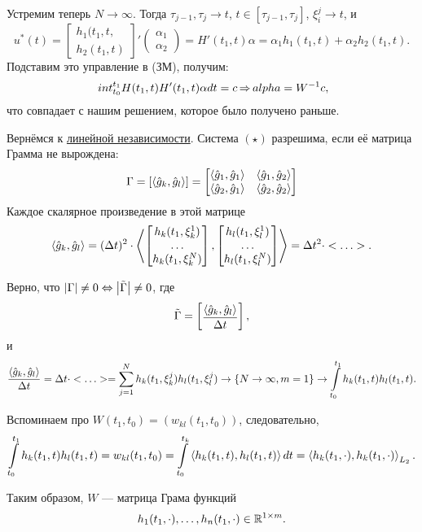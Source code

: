 Устремим теперь $N \to \infty$. Тогда $\tau_{j-1}, \tau_{j} \to t$, $t \in [\tau_{j-1}, \tau_{j}]$, $\xi_i^j \to t$, и
$$
u^*(t) = 
\begin{bmatrix}
    h_1(t_1, t, \\
    h_2(t_1, t)    
\end{bmatrix}'
\begin{pmatrix}
    \alpha_1\\
    \alpha_2
\end{pmatrix}
= H'(t_1, t) \alpha
= \alpha_1 h_1(t_1, t) + \alpha_2 h_2(t_1, t).
$$
Подставим это управление в (ЗМ), получим:
$$
\   int_{t_0}^{t_1} H(t_1, t) H'(t_1, t) \alpha dt = c \operatorname*{\Rightarrow} alpha = W^{-1} c,
$$
что совпадает с нашим решением, которое было получено раньше.

Вернёмся к \underline{линейной независимости}.
Система $(\star)$ разрешима, если её матрица Грамма не вырождена:
$$
\Gamma = \left[ \left < \hat{g}_k, \hat{g}_l \right > \right] =
\begin{bmatrix}
    \left < \hat{g}_1, \hat{g}_1 \right > & \left < \hat{g}_1, \hat{g}_2 \right > \\
    \left < \hat{g}_2, \hat{g}_1 \right > & \left < \hat{g}_2, \hat{g}_2 \right > 
\end{bmatrix}
$$
Каждое скалярное произведение в этой матрице
$$
\left < \hat{g}_k, \hat{g}_l \right > = (\Delta t)^2 \cdot \left < 
\begin{bmatrix}
    h_k(t_1, \xi_k^1) \\
    \ldots \\
    h_k(t_1, \xi_k^N)
\end{bmatrix}
, 
    \begin{bmatrix}
        h_l(t_1, \xi_l^1) \\
        \ldots \\
        h_l(t_1, \xi_l^N)
    \end{bmatrix}
 \right > = \Delta t^2 \cdot <\ldots>.
$$

Верно, что $\left\lvert \Gamma \right\rvert \neq 0 \Leftrightarrow \left\lvert \tilde{\Gamma} \right\rvert \neq 0$, где
$$
\tilde{\Gamma} = 
\begin{bmatrix}
    \dfrac{\left < \hat{g}_k, \hat{g}_l \right >}{\Delta t}
\end{bmatrix},
$$
и
$$
\dfrac{\left < \hat{g}_k, \hat{g}_l \right >}{\Delta t} = \Delta t \cdot <\ldots> =
\sum\limits_{j = 1}^{N} h_k (t_1, \xi_k^j) h_l (t_1, \xi_l^j) \to \{ N \to \infty, m = 1 \} \to \int\limits_{t_0}^{t_1} h_k (t_1, t) h_l(t_1, t).
$$

Вспоминаем про $W(t_1, t_0) = (w_{kl}(t_1, t_0))$, следовательно,
$$
\int\limits_{t_0}^{t_1} h_k (t_1, t) h_l(t_1, t) = w_{kl}(t_1, t_0) =
\int\limits_{t_0}^{t_k} \left < h_k(t_1, t),  h_l(t_1, t) \right > dt = \left < h_k(t_1, \cdot), h_k(t_1, \cdot) \right >_{L_2}.
$$

Таким образом, $W$ --- матрица Грама функций
$$
h_1(t_1, \cdot), \ldots, h_n(t_1, \cdot) \in \mathbb{R}^{1 \times m}.
$$